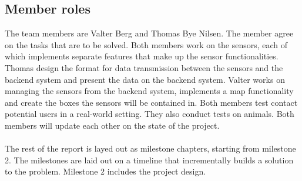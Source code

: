 	\subsection{Member roles}
		The team members are Valter Berg and Thomas Bye Nilsen. The member agree on the tasks that are to be solved. Both members work on the sensors, each of which implements separate features that make up the sensor functionalities. Thomas design the format for data transmission between the sensors and the backend system and present the data on the backend system. Valter works on managing the sensors from the backend system, implements a map functionality and create the boxes the sensors will be contained in. Both members test contact potential users in a real-world setting. They also conduct tests on animals. Both members will update each other on the state of the project.
		\\\\
		The rest of the report is layed out as milestone chapters, starting from milestone 2. The milestones are laid out on a timeline that incrementally builds a solution to the problem. Milestone 2 includes the project design.
		
		
		
















